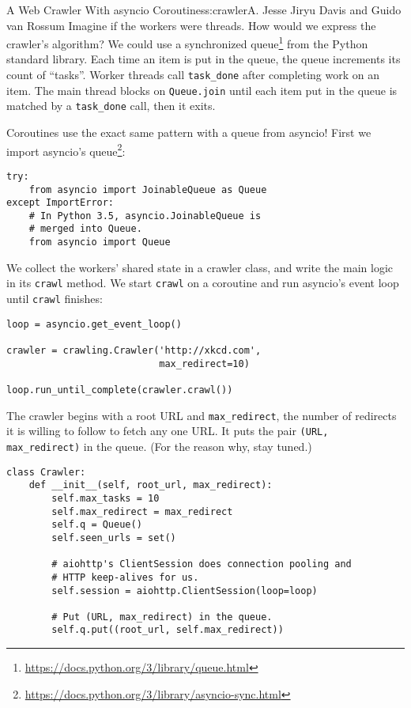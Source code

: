 \begin{aosachapter}{A Web Crawler With asyncio Coroutines}{s:crawler}{A. Jesse Jiryu Davis and Guido van Rossum}
Imagine if the workers were threads. How would we express the crawler's
algorithm? We could use a synchronized queue\footnote{\url{https://docs.python.org/3/library/queue.html}}
from the Python standard library. Each time an item is put in the queue,
the queue increments its count of ``tasks''. Worker threads call
\texttt{task\_done} after completing work on an item. The main thread
blocks on \texttt{Queue.join} until each item put in the queue is
matched by a \texttt{task\_done} call, then it exits.

Coroutines use the exact same pattern with a queue from asyncio! First
we import asyncio's queue\footnote{\url{https://docs.python.org/3/library/asyncio-sync.html}}:

\begin{verbatim}
try:
    from asyncio import JoinableQueue as Queue
except ImportError:
    # In Python 3.5, asyncio.JoinableQueue is
    # merged into Queue.
    from asyncio import Queue
\end{verbatim}

We collect the workers' shared state in a crawler class, and write the
main logic in its \texttt{crawl} method. We start \texttt{crawl} on a
coroutine and run asyncio's event loop until \texttt{crawl} finishes:

\begin{verbatim}
loop = asyncio.get_event_loop()

crawler = crawling.Crawler('http://xkcd.com',
                           max_redirect=10)

loop.run_until_complete(crawler.crawl())
\end{verbatim}

The crawler begins with a root URL and \texttt{max\_redirect}, the
number of redirects it is willing to follow to fetch any one URL. It
puts the pair \texttt{(URL, max\_redirect)} in the queue. (For the
reason why, stay tuned.)

\begin{verbatim}
class Crawler:
    def __init__(self, root_url, max_redirect):
        self.max_tasks = 10
        self.max_redirect = max_redirect
        self.q = Queue()
        self.seen_urls = set()
        
        # aiohttp's ClientSession does connection pooling and
        # HTTP keep-alives for us.
        self.session = aiohttp.ClientSession(loop=loop)
        
        # Put (URL, max_redirect) in the queue.
        self.q.put((root_url, self.max_redirect))
\end{verbatim}


\end{aosachapter}
